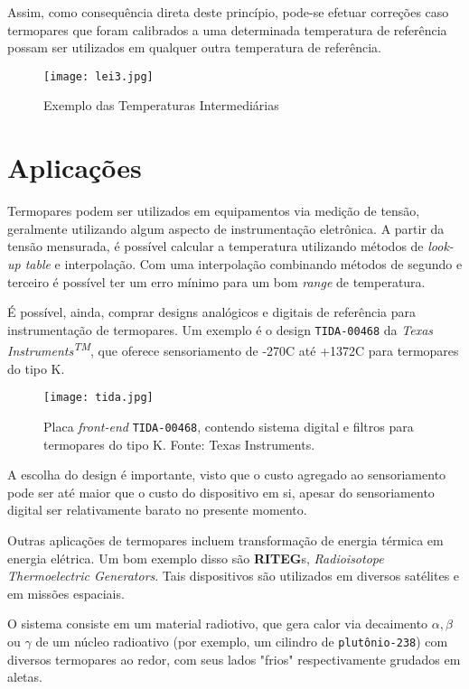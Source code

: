 \documentclass[a4paper,12pt]{report}
\begin{document}
	\singlespacing
	
	Assim, como consequência direta deste princípio, pode-se efetuar correções caso termopares que foram calibrados a uma determinada temperatura de referência possam ser utilizados em qualquer outra temperatura de referência.
	
	\begin{figure}[htbp]
		\centering
		\texttt{[image: lei3.jpg]}
		\caption{Exemplo das Temperaturas Intermediárias}
		\label{lei3}
	\end{figure}
	
	\chapter{Aplicações}
	
	Termopares podem ser utilizados em equipamentos via medição de tensão, geralmente utilizando algum aspecto de instrumentação eletrônica. A partir da tensão mensurada, é possível calcular a temperatura utilizando métodos de \textit{look-up table} e interpolação. Com uma interpolação combinando métodos de segundo e terceiro é possível ter um erro mínimo para um bom \textit{range} de temperatura. 
	
	É possível, ainda, comprar designs analógicos e digitais de referência para instrumentação de termopares. Um exemplo é o design \texttt{TIDA-00468} da \textit{Texas Instruments\textsuperscript{TM}}, que oferece sensoriamento de -270\degree C até +1372\degree C para termopares do tipo K.
	
	\begin{figure}[H]
		\centering
		\texttt{[image: tida.jpg]}\\
		\caption{Placa \textit{front-end} \texttt{TIDA-00468}, contendo sistema digital e filtros para termopares do tipo K. Fonte: Texas Instruments.}
	\end{figure}
	
	A escolha do design é importante, visto que o custo agregado ao sensoriamento pode ser até maior que o custo do dispositivo em si, apesar do sensoriamento digital ser relativamente barato no presente momento.
	
	Outras aplicações de termopares incluem transformação de energia térmica em energia elétrica. Um bom exemplo disso são \textbf{RITEG}s, \textit{Radioisotope Thermoelectric Generators}. Tais dispositivos são utilizados em diversos satélites e em missões espaciais. 
	
	O sistema consiste em um material radiotivo, que gera calor via decaimento $\alpha, \beta$ ou $\gamma$ de um núcleo radioativo (por exemplo, um cilindro de \texttt{plutônio-238}) com diversos termopares ao redor, com seus lados "frios" respectivamente grudados em aletas.
	
\end{document}
